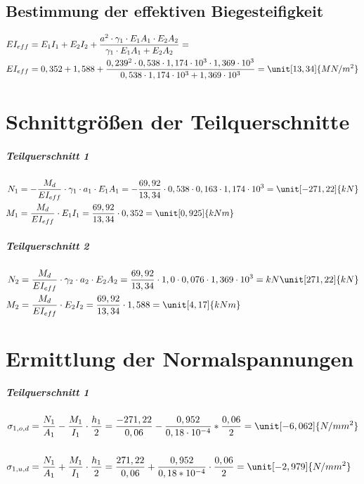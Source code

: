 \subsection{Bestimmung der effektiven Biegesteifigkeit}
\begin{align*}
EI_{eff}&=E_{1}I_{1}+E_{2}I_{2}+\dfrac{a^{2} \cdot \gamma_{1} \cdot E_{1}A_{1} \cdot E_{2}A_{2}}{\gamma_{1} \cdot E_{1}A_{1}+E_{2}A_{2}}= \\
EI_{eff}&=0,352+1,588+\dfrac{0,239^{2} \cdot 0,538 \cdot 1,174 \cdot 10^{3} \cdot 1,369 \cdot 10^{3}}{0,538 \cdot 1,174 \cdot 10^{3}+1,369 \cdot 10^{3}}= \unit[13,34]{MN/m^{2}} \\
\end{align*}

\section{Schnittgrößen der Teilquerschnitte}

\subparagraph{Teilquerschnitt 1}
\begin{align*}
N_{1}&=-\dfrac{M_{d}}{EI_{eff}} \cdot \gamma_{1} \cdot a_{1} \cdot E_{1}A_{1}=-\dfrac{69,92}{13,34} \cdot 0,538 \cdot 0,163 \cdot 1,174 \cdot 10^{3}=\unit[-271,22]{kN}\\
M_{1}&=\dfrac{M_{d}}{EI_{eff}} \cdot E_{1}I_{1}=\dfrac{69,92}{13,34} \cdot 0,352= \unit[0,925]{kNm}\\
\end{align*}

\subparagraph{Teilquerschnitt 2}
\begin{align*}
N_{2}&=\dfrac{M_{d}}{EI_{eff}} \cdot \gamma_{2} \cdot a_{2} \cdot E_{2}A_{2}=\dfrac{69,92}{13,34} \cdot  1,0 \cdot 0,076 \cdot 1,369 \cdot 10^{3}= kN\unit[271,22]{kN} \\
M_{2}&=\dfrac{M_{d}}{EI_{eff}} \cdot E_{2}I_{2}=\dfrac{69,92}{13,34} \cdot 1,588=\unit[4,17]{kNm}\\
\end{align*}


\section{Ermittlung der Normalspannungen}
\subparagraph{Teilquerschnitt 1}
\begin{align*}
\sigma_{1,o,d}&=\dfrac{N_{1}}{A_{1}}-\dfrac{M_{1}}{I_{1}} \cdot \dfrac{h_{1}}{2}=\dfrac{-271,22}{0,06}-\dfrac{0,952}{0,18 \cdot 10^{-4}}*\dfrac{0,06}{2}=  \unit[-6,062]{N/mm^{2}}\\\\
\sigma_{1,u,d}&=\dfrac{N_{1}}{A_{1}}+\dfrac{M_{1}}{I_{1}} \cdot \dfrac{h_{1}}{2}=\dfrac{271,22}{0,06}+\dfrac{0,952}{0,18*10^{-4}} \cdot \dfrac{0,06}{2}= \unit[-2,979]{N/mm^{2}}
\end{align*}


